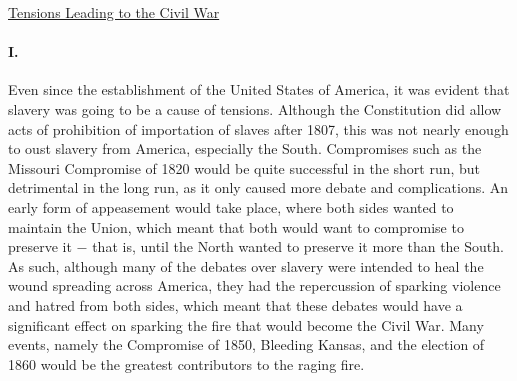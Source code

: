 \documentclass[12pt]{article}
\begin{document}
\begin{center}
  \underline{Tensions Leading to the Civil War} 
\end{center}

\paragraph{I.} Even since the establishment of the United States of America, it was evident that slavery was going to be a cause of tensions. Although the Constitution did allow acts of prohibition of importation of slaves after 1807, this was not nearly enough to oust slavery from America, especially the South. Compromises such as the Missouri Compromise of 1820 would be quite successful in the short run, but detrimental in the long run, as it only caused more debate and complications. An early form of appeasement would take place, where both sides wanted to maintain the Union, which meant that both would want to compromise to preserve it $-$ that is, until the North wanted to preserve it more than the South. As such, although many of the debates over slavery were intended to heal the wound spreading across America, they had the repercussion of sparking violence and hatred from both sides, which meant that these debates would have a significant effect on sparking the fire that would become the Civil War. Many events, namely the Compromise of 1850, Bleeding Kansas, and the election of 1860 would be the greatest contributors to the raging fire.
\end{document}
